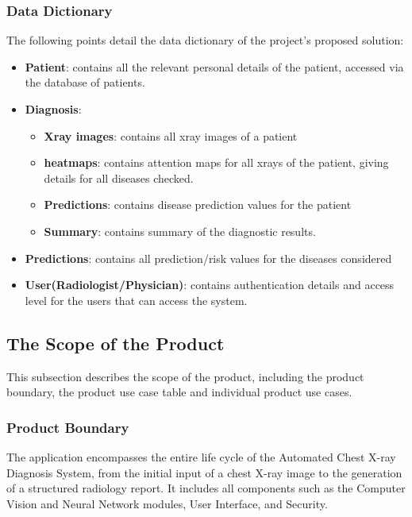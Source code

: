 \documentclass[12pt]{article}
\begin{document}
\subsubsection{Data Dictionary}
The following points detail the data dictionary of the project's proposed solution:
\begin{itemize}
    \item \textbf{Patient}: contains all the relevant personal details of the patient, accessed via the database of patients.
    \item \textbf{Diagnosis}:
        \begin{itemize}
            \item \textbf{Xray images}: contains all xray images of a patient
            \item \textbf{heatmaps}: contains attention maps for all xrays of the patient, giving details for all diseases checked.
            \item \textbf{Predictions}: contains disease prediction values for the patient
            \item \textbf{Summary}: contains summary of the diagnostic results.
        \end{itemize}
    \item \textbf{Predictions}: contains all prediction/risk values for the diseases considered
    \item \textbf{User(Radiologist/Physician)}: contains authentication details and access level for the users that can access the system.
\end{itemize}

\subsection{The Scope of the Product}
This subsection describes the scope of the product, including the product boundary, the product use case table and individual product use cases.

\subsubsection{Product Boundary}
The application encompasses the entire life cycle of the Automated Chest X-ray Diagnosis System, from the initial input of a chest X-ray image to the generation of a structured radiology report. It includes all components such as the Computer Vision and Neural Network modules, User Interface, and Security. 
\end{document}
